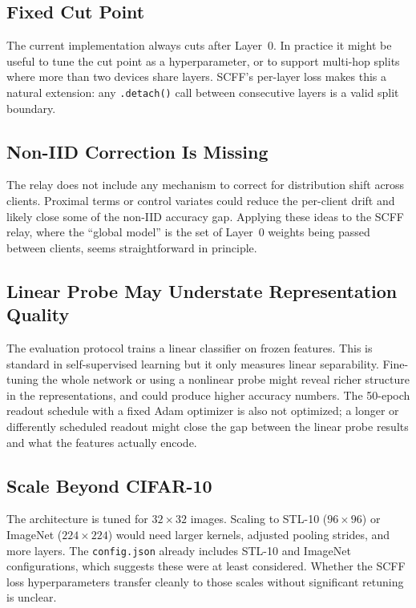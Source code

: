 \documentclass[12pt]{article}
\begin{document}
\subsection{Fixed Cut Point}

The current implementation always cuts after Layer~0. In practice it might be useful to tune
the cut point as a hyperparameter, or to support multi-hop splits where more than two devices
share layers. SCFF's per-layer loss makes this a natural extension: any \texttt{.detach()} call
between consecutive layers is a valid split boundary.

\subsection{Non-IID Correction Is Missing}

The relay does not include any mechanism to correct for distribution shift across clients.
Proximal terms \citep{li2020fedprox} or control variates \citep{karimireddy2020scaffold} could
reduce the per-client drift and likely close some of the non-IID accuracy gap. Applying these
ideas to the SCFF relay, where the ``global model'' is the set of Layer~0 weights being passed
between clients, seems straightforward in principle.

\subsection{Linear Probe May Understate Representation Quality}

The evaluation protocol trains a linear classifier on frozen features. This is standard in
self-supervised learning but it only measures linear separability. Fine-tuning the whole network
or using a nonlinear probe might reveal richer structure in the representations, and could
produce higher accuracy numbers. The 50-epoch readout schedule with a fixed Adam optimizer is
also not optimized; a longer or differently scheduled readout might close the gap between the
linear probe results and what the features actually encode.

\subsection{Scale Beyond CIFAR-10}

The architecture is tuned for $32\times32$ images. Scaling to STL-10 ($96\times96$) or
ImageNet ($224\times224$) would need larger kernels, adjusted pooling strides, and more layers.
The \texttt{config.json} already includes STL-10 and ImageNet configurations, which suggests
these were at least considered. Whether the SCFF loss hyperparameters transfer cleanly to those
scales without significant retuning is unclear.
\end{document}
